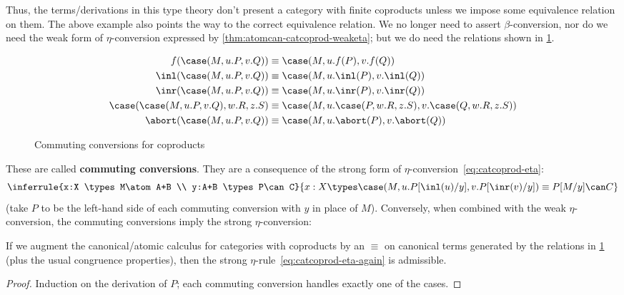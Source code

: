 Thus, the terms/derivations in this type theory don't present a category with finite coproducts unless we impose some equivalence relation on them.
The above example also points the way to the correct equivalence relation.
We no longer need to assert $\beta$-conversion, nor do we need the weak form of $\eta$-conversion expressed by \cref{thm:atomcan-catcoprod-weaketa}; but we do need the relations shown in \cref{fig:catcoprod-commconv}.
\begin{figure}
  \centering
  \begin{align*}
    f(\case(M,u.P,v.Q)) &\equiv \case(M,u.f(P),v.f(Q))\\
    \inl(\case(M,u.P,v.Q)) &\equiv \case(M,u.\inl(P),v.\inl(Q))\\
    \inr(\case(M,u.P,v.Q)) &\equiv \case(M,u.\inr(P),v.\inr(Q))\\
    \case(\case(M,u.P,v.Q),w.R,z.S) &\equiv \case(M,u.\case(P,w.R,z.S),v.\case(Q,w.R,z.S))\\
    \abort(\case(M,u.P,v.Q)) &\equiv \case(M,u.\abort(P),v.\abort(Q))
  \end{align*}
  \caption{Commuting conversions for coproducts}
  \label{fig:catcoprod-commconv}
\end{figure}
These are called \textbf{commuting conversions}.
They are a consequence of the strong form of $\eta$-conversion~\eqref{eq:catcoprod-eta}:
\begin{equation}
  \inferrule{x:X \types M\atom A+B \\ y:A+B \types P\can C}{x:X \types \case(M,u.P[\inl(u)/y],v.P[\inr(v)/y]) \equiv P[M/y] \can C}\label{eq:catcoprod-eta-again}
\end{equation}
(take $P$ to be the left-hand side of each commuting conversion with $y$ in place of $M$).
Conversely, when combined with the weak $\eta$-conversion, the commuting conversions imply the strong $\eta$-conversion:

\begin{thm}\label{thm:atomcan-catcoprod-eta}
  If we augment the canonical/atomic calculus for categories with coproducts by an $\equiv$ on canonical terms generated by the relations in \cref{fig:catcoprod-commconv} (plus the usual congruence properties), then the strong $\eta$-rule~\eqref{eq:catcoprod-eta-again} is admissible.
\end{thm}
\begin{proof}
  Induction on the derivation of $P$; each commuting conversion handles exactly one of the cases.
\end{proof}

